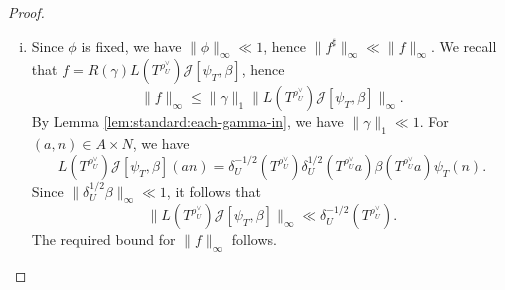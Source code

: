 \documentclass[reqno]{amsart}
\def\O{\operatorname{O}}
\theoremstyle{plain} \newtheorem{theorem} {Theorem}
\theoremstyle{definition} \newtheorem{definition} [theorem] {Definition}
\theoremstyle{itplain} %
\numberwithin{equation}{section}
\numberwithin{theorem}{section}
\renewcommand{\leq}{\leqslant}
\begin{document}
\begin{proof}
\begin{enumerate}[(i)]
    We observe next that, for $h \in U \backslash G$,
    \begin{align*}
      f(h)
      &= L(T^{\rho_U^\vee}) R(\gamma) \mathcal{J}[\psi_T,\beta](h)
      \\
      &=
        R(\gamma) L(T^{\rho_U^\vee})  \mathcal{J}[\psi_T,\beta](h)
      \\
      &=
        \delta_U^{-1/2}(T^{\rho_U^\vee})
        \int _{g \in G}  \mathcal{J}[\psi_T,\beta]( T^{\rho_U^\vee} h g) \gamma(g),
    \end{align*}
    hence
    \begin{equation}\label{eq:f-t--1}
      f (T ^{- \rho _U ^\vee } h)
      =
      \delta_U^{-1/2}(T^{\rho_U^\vee})
      \int _{g \in G}
      \mathcal{J}[\psi_T,\beta](h g) \gamma(g).
    \end{equation}
    Suppose now that $f^\sharp(T^{-\rho_U^\vee} h) \neq 0$.  In particular,  $f(T^{-\rho_U^\vee} h) \neq 0$.  We saw above that then $h = a n$ with $(a,n) \in A \times N$ and $n = 1 + \O(T^{-1/2+o(1)})$, hence in particular $n = 1 + o(1)$.  We see also from \eqref{eq:f-t--1} that for some $g$ in the support of $\gamma$, we have $\mathcal{J}[\psi_T,\beta](h g) \neq 0$.  By \eqref{eq:mathc-betag-neq}, it follows that
    \begin{equation}\label{eq:mathfrakah-g-ll}
      \|(h g)_A\| \ll T^{o(1)}.
    \end{equation}
    Recall that, by the definition of $\mathfrak{C}(G,-\theta_G(\psi),T,1/2)$ (Definition \ref{defn:standard:let-v-be}, \eqref{eq:mathfrakcg-theta-t}), we have for each such $g$ that $g = 1 + \O(T^{-1/2}) = 1 + o(1)$, hence $n g = 1 + o(1)$.  By \eqref{eq:mathfraka-a-g} and the identity $h g = a n g$, it follows that $a^{-1} (h g)_A = 1 + o(1)$.  By \eqref{eq:mathfrakah-g-ll}, we obtain $\|a\| \ll T^{o(1)}$.  This completes the proof of the required estimate \eqref{eq:f-t-}.

  \item
    Since $\phi$ is fixed, we have $\|\phi \|_\infty \ll 1$, hence $\|f ^\sharp \| _\infty \ll \|f\| _\infty$.  We recall that $f =  R(\gamma) L(T ^{\rho _U ^\vee }) \mathcal{J}[\psi_T, \beta]$, hence
    \begin{equation*}
      \|f\|_\infty \leq \|\gamma\|_1 \|L(T ^{\rho _U ^\vee }) \mathcal{J}[\psi_T, \beta]\|_{\infty}.
    \end{equation*}
    By Lemma \ref{lem:standard:each-gamma-in}, we have $\|\gamma \|_1 \ll 1$.  For $(a,n) \in A \times N$, we have
    \begin{equation*}
      L(T^{\rho_U^\vee}) \mathcal{J}[\psi_T,\beta](a n)
      =
      \delta_U^{-1/2}(T^{\rho_U^\vee})  \delta_U^{1/2}(T^{\rho_U^\vee} a) \beta(T^{\rho_U^\vee} a) \psi_T(n).
    \end{equation*}
    Since $\|\delta_U^{1/2} \beta \|_{\infty} \ll 1$, it follows that
    \begin{equation*}
      \|L(T^{\rho_U^\vee}) \mathcal{J}[\psi_T,\beta]\|_{\infty} \ll \delta_U^{-1/2}(T^{\rho_U^\vee}).
    \end{equation*}
    The required bound for $\|f\|_\infty$ follows.


\end{enumerate}
\end{proof}
\end{document}
